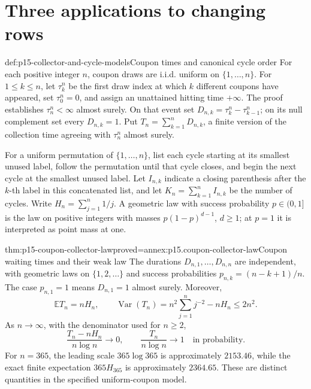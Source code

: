 \section{Three applications to changing rows}
\label{sec:p15-changing-row-applications}

\begin{hbdefinition}{def:p15-collector-and-cycle-models}{Coupon times and canonical cycle order}
For each positive integer \(n\), coupon draws are i.i.d. uniform on
\(\{1,\ldots,n\}\). For \(1\leq k\leq n\), let \(\tau_k^n\) be the first draw index at
which \(k\) different coupons have appeared, set \(\tau_0^n=0\),
and assign an unattained hitting time \(+\infty\). The proof establishes
\(\tau_n^n<\infty\) almost surely. On that event set
\(D_{n,k}=\tau_k^n-\tau_{k-1}^n\); on its null complement set
every \(D_{n,k}=1\). Put \(T_n=\sum_{k=1}^nD_{n,k}\), a finite
version of the collection time agreeing with \(\tau_n^n\) almost surely.

For a uniform permutation of \(\{1,\ldots,n\}\), list each cycle
starting at its smallest unused label, follow the permutation until
that cycle closes, and begin the next cycle at the smallest unused
label. Let \(I_{n,k}\) indicate a closing parenthesis after the
\(k\)-th label in this concatenated list, and let
\(K_n=\sum_{k=1}^n I_{n,k}\) be the number of cycles.
Write \(H_n=\sum_{j=1}^n1/j\).
A geometric law with success probability \(p\in(0,1]\) is the
law on positive integers with masses \(p(1-p)^{d-1}\), \(d\geq1\);
at \(p=1\) it is interpreted as point mass at one.
\end{hbdefinition}

\begin{hbtheorem}{thm:p15-coupon-collector-law}{proved=annex:p15.coupon-collector-law}{Coupon waiting times and their weak law}
The durations \(D_{n,1},\ldots,D_{n,n}\) are independent, with
geometric laws on \(\{1,2,\ldots\}\) and success probabilities
\(p_{n,k}=(n-k+1)/n\). The case \(p_{n,1}=1\) means
\(D_{n,1}=1\) almost surely. Moreover,
\[
 \mathbb ET_n=nH_n,\qquad
 \operatorname{Var}(T_n)=n^2\sum_{j=1}^n j^{-2}-nH_n\leq2n^2.
\]
As \(n\to\infty\), with the denominator used for \(n\geq2\),
\[
 \frac{T_n-nH_n}{n\log n}\longrightarrow0,\qquad
 \frac{T_n}{n\log n}\longrightarrow1
                                     \quad\text{in probability}.
\]
For \(n=365\), the leading scale \(365\log365\) is approximately
\(2153.46\), while the exact finite expectation \(365H_{365}\) is
approximately \(2364.65\). These are distinct quantities in the
specified uniform-coupon model.
\end{hbtheorem}

